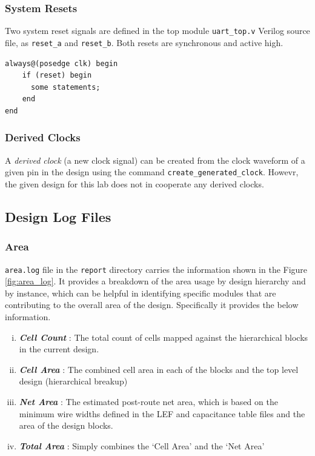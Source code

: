 \documentclass[a4paper,11pt]{article}%
\begin{document}
\subsubsection{System Resets}
Two system reset signals are defined in the top module {\tt uart\_top.v} Verilog source file, as {\tt reset\_a}  and {\tt reset\_b}. Both resets are synchronous and active high.

\begin{Verbatim}[frame=single]
always@(posedge clk) begin	
    if (reset) begin
      some statements;	   
    end
end
\end{Verbatim}

\subsubsection{Derived Clocks}

A \textit{derived clock} (a new clock signal) can be created from the clock waveform of a given pin in the design using the command {\tt create\_generated\_clock}\cite{genus_command_ref_2019}. Howevr, the given design for this lab does not in cooperate any derived clocks.

\subsection{Design Log Files}

\subsubsection{Area}

{\tt area.log} file in the {\tt report} directory carries the information shown in the Figure \ref{fig:area_log}. It provides a breakdown of the area usage by design hierarchy and by instance, which can be helpful in identifying specific modules that are contributing to the overall area of the design. Specifically it provides the below information\cite{genus_command_ref_2019}.

\begin{enumerate}[i.]
	\item \textbf{\textit{Cell Count}} : The total count of cells mapped against the hierarchical blocks in the current design.
	
	\item \textbf{\textit{Cell Area}} : The combined cell area in each of the blocks and the top level design (hierarchical breakup)
	
	\item \textbf{\textit{Net Area}} : The estimated post-route net area, which is based on the minimum wire widths defined in the LEF and capacitance table files and the area of the design blocks.
	
	\item \textbf{\textit{Total Area}} : Simply combines the `Cell Area' and the `Net Area'
\end{enumerate}
\end{document}
